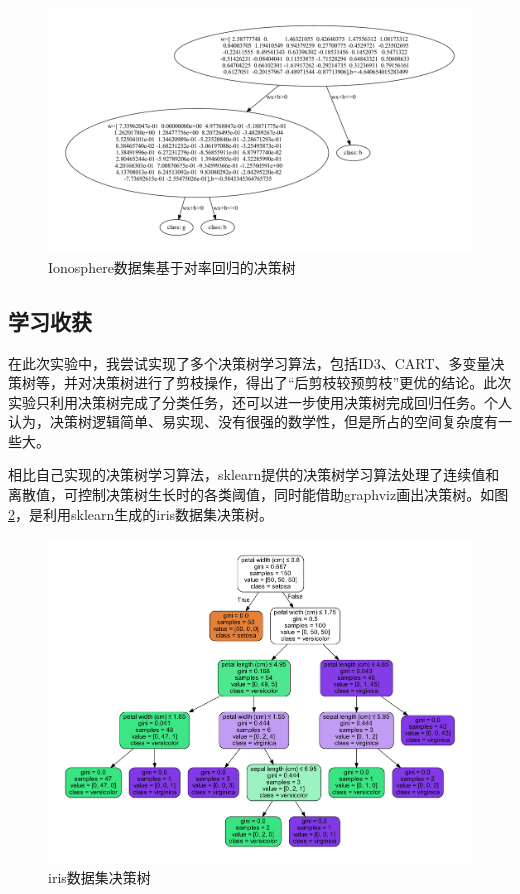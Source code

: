\documentclass{ctexart}
\begin{document}
	\begin{figure}[!htb]
		\centering
		\includegraphics[scale=1,width=\textwidth]{../image/multivariate-normal-ionosphere.gv.pdf}
		\caption{Ionosphere数据集基于对率回归的决策树}
		\label{Ionosphere数据集基于对率回归的决策树}
	\end{figure}
	
	\subsection{学习收获}
	
	在此次实验中，我尝试实现了多个决策树学习算法，包括ID3、CART、多变量决策树等，并对决策树进行了剪枝操作，得出了“后剪枝较预剪枝”更优的结论。此次实验只利用决策树完成了分类任务，还可以进一步使用决策树完成回归任务。个人认为，决策树逻辑简单、易实现、没有很强的数学性，但是所占的空间复杂度有一些大。
	
	相比自己实现的决策树学习算法，sklearn提供的决策树学习算法处理了连续值和离散值，可控制决策树生长时的各类阈值，同时能借助graphviz画出决策树。如图\ref{iris数据集决策树}，是利用sklearn生成的iris数据集决策树。
	
	\begin{figure}[!htb]
		\centering
		\includegraphics[scale=1,width=\textwidth]{../image/iris.gv.pdf}
		\caption{iris数据集决策树}
		\label{iris数据集决策树}
	\end{figure}
	
\end{document}
